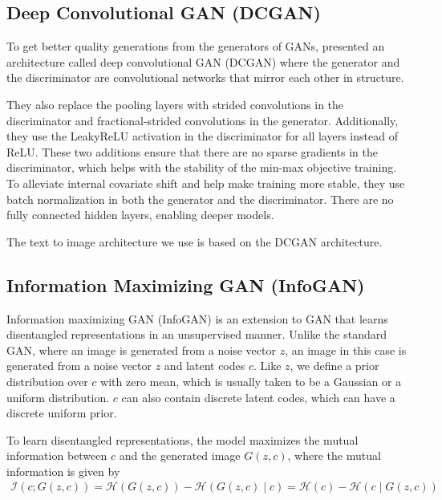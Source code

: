 \documentclass{article}
\let\cite=\supercite
\begin{document}
\subsection{Deep Convolutional GAN (DCGAN)}

To get better quality generations from the generators of GANs, \cite{dcgan} presented an architecture called deep convolutional GAN (DCGAN) where the generator and the discriminator are convolutional networks that mirror each other in structure.

They also replace the pooling layers with strided convolutions in the discriminator and fractional-strided convolutions in the generator. Additionally, they use the LeakyReLU activation in the discriminator for all layers instead of ReLU. These two additions ensure that there are no sparse gradients in the discriminator, which helps with the stability of the min-max objective training. To alleviate internal covariate shift and help make training more stable, they use batch normalization \cite{batchnorm} in both the generator and the discriminator. There are no fully connected hidden layers, enabling deeper models.

The text to image architecture we use is based on the DCGAN architecture.



\subsection{Information Maximizing GAN (InfoGAN)}

Information maximizing GAN (InfoGAN)\cite{infogan} is an extension to GAN that learns disentangled representations in an unsupervised manner. Unlike the standard GAN, where an image is generated from a noise vector $z$, an image in this case is generated from a noise vector $z$ and latent codes $c$. Like $z$, we define a prior distribution over $c$ with zero mean, which is usually taken to be a Gaussian or a uniform distribution. $c$ can also contain discrete latent codes, which can have a discrete uniform prior.

To learn disentangled representations, the model maximizes the mutual information between $c$ and the generated image $G(z,c)$, where the mutual information is given by
\begin{align}
\mathcal{I}(c;G(z,c)) = \mathcal{H}(G(z,c)) - \mathcal{H}(G(z,c) \mid c) = \mathcal{H}(c) - \mathcal{H}(c\mid G(z,c)) \label{eq:mi}
\end{align}
\end{document}
